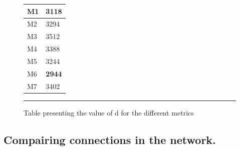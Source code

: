 \begin{figure}[htbp]
    \centering
    \begin{tabular}{|l|l|}
        \hline
        M1 & 3118 \\ \hline
        M2 & 3294 \\ \hline
        M3 & 3512 \\ \hline
        M4 & 3388 \\ \hline
        M5 & 3244 \\ \hline
        M6 & \textbf{2944} \\ \hline
        M7 & 3402 \\
        \hline
    \end{tabular}
    \label{fig:metrics}
    \rule{35em}{0.5pt}
    \caption[Table presenting the value of d for the different metrics ]{Table presenting the value of d for the different metrics}
\end{figure}



\subsection{Compairing connections in the network.}
